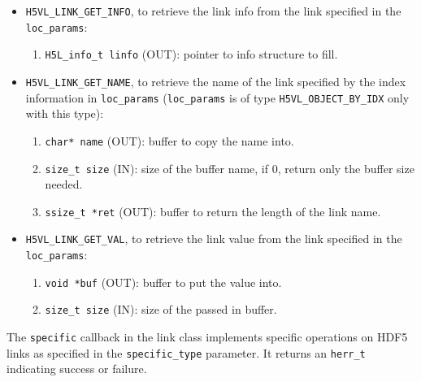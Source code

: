 \begin{itemize}
\item \texttt{H5VL\_LINK\_GET\_INFO}, to retrieve the link info from the
  link specified in the \texttt{loc\_params}:
  \begin{enumerate}
  \item \texttt{H5L\_info\_t linfo} (OUT): pointer to info structure to
    fill.
  \end{enumerate}

\item \texttt{H5VL\_LINK\_GET\_NAME}, to retrieve the name of the link
  specified by the index information in \texttt{loc\_params} (\texttt{loc\_params} is of type \texttt{H5VL\_OBJECT\_BY\_IDX} only with this
  type):
  \begin{enumerate}
  \item \texttt{char* name} (OUT): buffer to copy the name into.
  \item \texttt{size\_t size} (IN): size of the buffer name, if 0, return
    only the buffer size needed.
  \item \texttt{ssize\_t *ret} (OUT): buffer to return the length of the
    link name.
  \end{enumerate}

\item \texttt{H5VL\_LINK\_GET\_VAL}, to retrieve the link value from the
  link specified in the \texttt{loc\_params}:
  \begin{enumerate}
  \item \texttt{void *buf} (OUT): buffer to put the value into.
  \item \texttt{size\_t size} (IN): size of the passed in buffer.
  \end{enumerate}
\end{itemize}

The \texttt{specific} callback in the link class implements specific operations on HDF5 links as specified in the \texttt{specific\_type} parameter. It returns an \texttt{herr\_t} indicating success or failure.\bigskip


